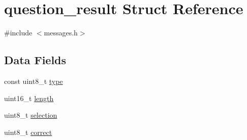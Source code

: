 \hypertarget{structquestion__result}{
\section{question\_\-result Struct Reference}
\label{structquestion__result}
}


{\ttfamily \#include $<$messages.h$>$}

\subsection*{Data Fields}
\begin{DoxyCompactItemize}
\item 
const uint8\_\-t \hyperlink{structquestion__result_aca7dafb0092715a03dd40f45fc607f2a}{type}
\item 
uint16\_\-t \hyperlink{structquestion__result_a1892eba2086d12ac2b09005aeb09ea3b}{length}
\item 
uint8\_\-t \hyperlink{structquestion__result_af190e8c7f8c6caf004f782b3aa7b5021}{selection}
\item 
uint8\_\-t \hyperlink{structquestion__result_a9e77be6b2d809446ab999d825cfb84f3}{correct}
\end{DoxyCompactItemize}


